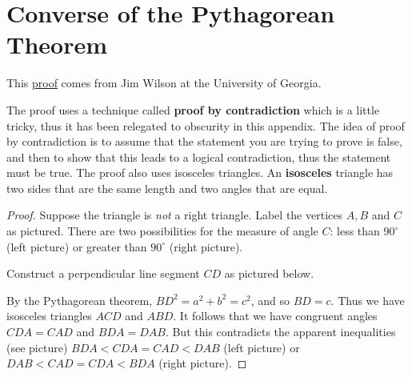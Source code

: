 \chapter{Converse of the Pythagorean Theorem}%
\label{app:converse-pythagorean-thm}

This \href{http://jwilson.coe.uga.edu/EMAT6680/Brown/6690/ConPythagThm.htm}%
{proof} comes from Jim Wilson at the University of Georgia.

The proof uses a technique called \textbf{proof by contradiction}
which is a little tricky, thus it has been relegated to obscurity in
this appendix. The idea of proof by contradiction is to assume that
the statement you are trying to prove is false, and then to show that
this leads to a logical contradiction, thus the statement must be
true. The proof also uses isosceles triangles. An \textbf{isosceles}
triangle has two sides that are the same length and two angles that
are equal.

\begin{proof}
  Suppose the triangle is \emph{not} a right triangle. Label the
  vertices \(A, B\) and \(C\) as pictured. There are two possibilities
  for the measure of angle \(C\): less than \(90^{\circ}\) (left
  picture) or greater than \(90^{\circ}\) (right picture).
  \begin{center}
    
  \end{center}
  Construct a perpendicular line segment \(CD\) as pictured below.
  \begin{center}
    
  \end{center}
  By the Pythagorean theorem, \(BD^{2} = a^{2} + b^{2} = c^{2}\), and
  so \(BD = c\). Thus we have isosceles triangles \(ACD\) and \(ABD\).
  It follows that we have congruent angles \(CDA = CAD\) and
  \(BDA = DAB\). But this contradicts the apparent inequalities (see
  picture) \(BDA < CDA = CAD < DAB\) (left picture) or
  \(DAB < CAD = CDA < BDA\) (right picture).
\end{proof}

